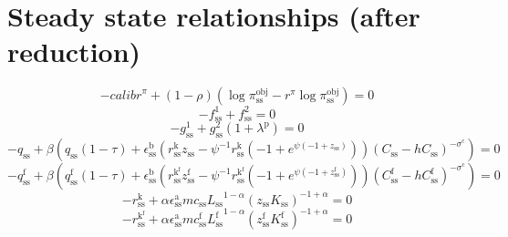 \section{Steady state relationships (after reduction)}

\begin{equation}
-{c\!a\!l\!i\!b\!r}^{\pi} + \left(1 - \rho\right) \left(\log{\pi^{\mathrm{obj}}_\mathrm{ss}} - {r^{\pi}} {\log{\pi^{\mathrm{obj}}_\mathrm{ss}}}\right) = 0
\end{equation}
\begin{equation}
-f^{\mathrm{1}}_\mathrm{ss} + f^{\mathrm{2}}_\mathrm{ss} = 0
\end{equation}
\begin{equation}
-g^{\mathrm{1}}_\mathrm{ss} + {g^{\mathrm{2}}_\mathrm{ss}} \left(1 + \lambda^{\mathrm{p}}\right) = 0
\end{equation}
\begin{equation}
-q_\mathrm{ss} + {\beta} \left({q_\mathrm{ss}} \left(1 - \tau\right) + {\epsilon^{\mathrm{b}}_\mathrm{ss}} \left({r^{\mathrm{k}}_\mathrm{ss}} {z_\mathrm{ss}} - {\psi}^{-1} {r^{\mathrm{k}}_\mathrm{ss}} \left(-1 + e^{{\psi} \left(-1 + z_\mathrm{ss}\right)}\right)\right) {\left(C_\mathrm{ss} - {h} {C_\mathrm{ss}}\right)^{-\sigma^{\mathrm{c}}}}\right) = 0
\end{equation}
\begin{equation}
-q^{\mathrm{f}}_\mathrm{ss} + {\beta} \left({q^{\mathrm{f}}_\mathrm{ss}} \left(1 - \tau\right) + {\epsilon^{\mathrm{b}}_\mathrm{ss}} \left({r^{\mathrm{k}^{\mathrm{f}}}_\mathrm{ss}} {z^{\mathrm{f}}_\mathrm{ss}} - {\psi}^{-1} {r^{\mathrm{k}^{\mathrm{f}}}_\mathrm{ss}} \left(-1 + e^{{\psi} \left(-1 + z^{\mathrm{f}}_\mathrm{ss}\right)}\right)\right) {\left(C^{\mathrm{f}}_\mathrm{ss} - {h} {C^{\mathrm{f}}_\mathrm{ss}}\right)^{-\sigma^{\mathrm{c}}}}\right) = 0
\end{equation}
\begin{equation}
-r^{\mathrm{k}}_\mathrm{ss} + {\alpha} {\epsilon^{\mathrm{a}}_\mathrm{ss}} {{m\!c}_\mathrm{ss}} {{L_\mathrm{ss}}^{1 - \alpha}} {\left({z_\mathrm{ss}} {K_\mathrm{ss}}\right)^{-1 + \alpha}} = 0
\end{equation}
\begin{equation}
-r^{\mathrm{k}^{\mathrm{f}}}_\mathrm{ss} + {\alpha} {\epsilon^{\mathrm{a}}_\mathrm{ss}} {{m\!c}^{\mathrm{f}}_\mathrm{ss}} {{L^{\mathrm{f}}_\mathrm{ss}}^{1 - \alpha}} {\left({z^{\mathrm{f}}_\mathrm{ss}} {K^{\mathrm{f}}_\mathrm{ss}}\right)^{-1 + \alpha}} = 0
\end{equation}
